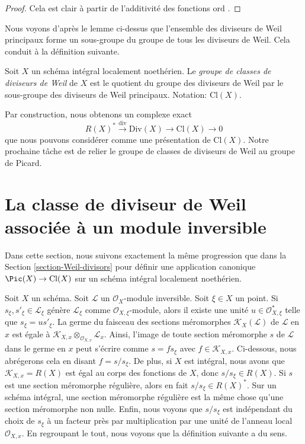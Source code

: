 \begin{proof}
Cela est clair à partir de l'additivité des fonctions  $\text{ord}$ .
\end{proof}

\noindent
Nous voyons d'après le lemme ci-dessus que l'ensemble des diviseurs de Weil
principaux forme un sous-groupe du groupe de tous les diviseurs de Weil. Cela
conduit à la définition suivante.

\begin{definition}
\label{definition-class-group}
Soit  $X$  un schéma intégral localement noethérien. Le
 {\it  groupe de classes de diviseurs de Weil }  de
 $X$  est le quotient du groupe des diviseurs de Weil par le sous-groupe
des diviseurs de Weil principaux. Notation:  $\text{Cl}(X)$.
\end{definition}

\noindent
Par construction, nous obtenons un complexe exact
\begin{equation}
\label{equation-Weil-divisor-class}
R(X)^* \xrightarrow{\text{div}} \text{Div}(X) \to \text{Cl}(X) \to 0
\end{equation}
que nous pouvons considérer comme une présentation de  $\text{Cl}(X)$. Notre
prochaine tâche est de relier le groupe de classes de diviseurs de Weil au groupe
de Picard.





\section{La classe de diviseur de Weil associée à un module inversible}
\label{section-c1}

\noindent
Dans cette section, nous suivons exactement la même progression que dans la
Section  \ref{section-Weil-divisors}  pour définir une application canonique  $\Pic(X) \to \text{Cl}(X)$  sur un
schéma intégral localement noethérien.

\medskip\noindent
Soit  $X$  un schéma. Soit  $\mathcal{L}$  un  $\mathcal{O}_X$-module inversible.
Soit  $\xi \in X$  un point. Si  $s_\xi, s'_\xi \in \mathcal{L}_\xi$  génère  $\mathcal{L}_\xi$  comme
 $\mathcal{O}_{X, \xi}$-module, alors il existe une unité  $u \in \mathcal{O}_{X, \xi}^*$  telle que
 $s_\xi = u s'_\xi$. La germe du faisceau des sections méromorphes  $\mathcal{K}_X(\mathcal{L})$  de
 $\mathcal{L}$  en  $x$  est égale à  $\mathcal{K}_{X, x} \otimes_{\mathcal{O}_{X, x}} \mathcal{L}_x$. Ainsi, l'image de toute
section méromorphe  $s$  de  $\mathcal{L}$  dans le germe en  $x$  peut
s'écrire comme  $s = fs_\xi$  avec  $f \in \mathcal{K}_{X, x}$. Ci-dessous, nous abrégerons cela en
disant  $f = s/s_\xi$. De plus, si  $X$  est intégral, nous avons que
 $\mathcal{K}_{X, x} = R(X)$  est égal au corps des fonctions de  $X$, donc  $s/s_\xi \in R(X)$.
Si  $s$  est une section méromorphe régulière, alors en fait  $s/s_\xi \in R(X)^*$.
Sur un schéma intégral, une section méromorphe régulière est la même chose qu'une
section méromorphe non nulle. Enfin, nous voyons que  $s/s_\xi$  est indépendant
du choix de  $s_\xi$  à un facteur près par multiplication par une unité de
l'anneau local  $\mathcal{O}_{X, x}$. En regroupant le tout, nous voyons que la définition
suivante a du sens.

